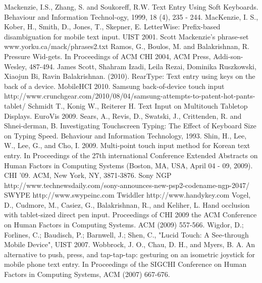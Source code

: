\documentclass{chi2011}
\begin{document}
\begin{thebibliography}{9}
 Mackenzie, I.S., Zhang, S. and Soukoreff, R.W. Text Entry Using Soft Keyboards. Behaviour and Information Technol-ogy, 1999, 18 (4), 235 - 244.
 MacKenzie, I. S., Kober, H., Smith, D., Jones, T., Skepner, E. LetterWise: Prefix-based disambiguation for mobile text input. UIST 2001.
 Scott Mackenzie's phrase-set\\ www.yorku.ca/mack/phrases2.txt
 Ramos, G., Boulos, M. and Balakrishnan, R. Pressure Wid-gets. In Proceedings of ACM CHI 2004, ACM Press, Addi-son-Wesley, 487-494.
 James Scott, Shahram Izadi, Leila Rezai, Dominika Ruszkowski, Xiaojun Bi, Ravin Balakrishnan. (2010). RearType: Text entry using keys on the back of a device. MobileHCI 2010.
 Samsung back-of-device touch input\\
http://www.crunchgear.com/2010/08/04/samsung-attempts-to-patent-hot-pants-tablet/ 
 Schmidt T., Konig W., Reiterer H. Text Input on Multitouch Tabletop Displays. EuroVis 2009.
 Sears, A., Revis, D., Swatski, J., Crittenden, R. and Shnei-derman, B. Investigating Touchscreen Typing: The Effect of Keyboard Size on Typing Speed. Behaviour and Information Technology, 1993.
 Shin, H., Lee, W., Lee, G., and Cho, I. 2009. Multi-point touch input method for Korean text entry. In Proceedings of the 27th international Conference Extended Abstracts on Human Factors in Computing Systems (Boston, MA, USA, April 04 - 09, 2009). CHI '09. ACM, New York, NY, 3871-3876.
 Sony NGP http://www.technewsdaily.com/sony-announces-new-psp2-codename-ngp-2047/
 SWYPE http://www.swypeinc.com
 Twiddler http://www.handykey.com
 Vogel, D., Cudmore, M., Casiez, G., Balakrishnan, R., and Keliher, L. Hand occlusion with tablet-sized direct pen input. Proceedings of CHI 2009  the ACM Conference on Human Factors in Computing Systems. ACM (2009) 557-566. 
 Wigdor, D.; Forlines, C.; Baudisch, P.; Barnwell, J.; Shen, C., "Lucid Touch: A See-through Mobile Device", UIST 2007.
 Wobbrock, J. O., Chau, D. H., and Myers, B. A. An alternative to push, press, and tap-tap-tap: gesturing on an isometric joystick for mobile phone text entry. In Proceedings of the SIGCHI Conference on Human Factors in Computing Systems, ACM (2007) 667-676.



\end{thebibliography}
\end{document}
